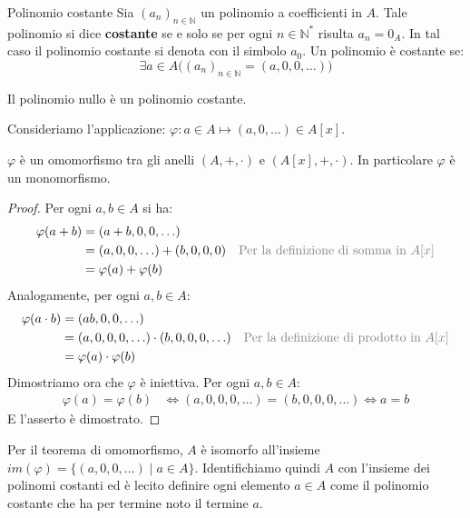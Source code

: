 \begin{defbox}{Polinomio costante}
	Sia $(a_{n})_{n \in \mathbb{N}}$ un polinomio a coefficienti in $A$. Tale polinomio si dice \textbf{costante} se e solo se per ogni $n \in \mathbb{N}^{*}$ risulta $a_{n}=0_{A}$. In tal caso il polinomio costante si denota con il simbolo $a_{0}$. Un polinomio è costante se:
	\begin{displaymath}
		\exists a \in A \bigl( (a_{n})_{n \in \mathbb{N}} = (a,0,0,\ldots) \bigr)
	\end{displaymath}
\end{defbox}

\begin{osservation}
	Il polinomio nullo è un polinomio costante.
\end{osservation}

Consideriamo l'applicazione: $ \varphi: a \in A \mapsto (a,0,\ldots) \in A[x]$.
\begin{propbox}
	$\varphi$ è un omomorfismo tra gli anelli $(A,+,\cdot)$ e $(A[x],+,\cdot)$. In particolare $\varphi$ è un monomorfismo.
\end{propbox}

\begin{proof}
	Per ogni $a,b \in A$ si ha:
	\begin{align*}
		\varphi(a+b) &= (a+b,0,0,\ldots) \\
		&= (a,0,0,\ldots)+(b,0,0,0) & \text{\textcolor{gray}{Per la definizione di somma in $A[x]$}}\\
		&= \varphi(a) + \varphi(b)
	\end{align*}
	Analogamente, per ogni $a,b \in A$:
	\begin{align*}
		\varphi(a \cdot b) &= (ab,0,0,\ldots) \\
		&= (a,0,0,0,\ldots) \cdot (b,0,0,0,\ldots) & \text{\textcolor{gray}{Per la definizione di prodotto in $A[x]$}}\\
		&= \varphi(a) \cdot \varphi(b)
	\end{align*}
	Dimostriamo ora che $\varphi$ è iniettiva. Per ogni $a,b \in A$:
	\begin{align*}
		\varphi(a)= \varphi(b) &\iff (a,0,0,0,\ldots) = (b,0,0,0,\ldots) \iff a=b
	\end{align*}
	E l'asserto è dimostrato.
\end{proof}

Per il teorema di omomorfismo, $A$ è isomorfo all'insieme $im(\varphi)=\{(a,0,0,\ldots) \; | \; a \in A \} $. Identifichiamo quindi $A$ con l'insieme dei polinomi costanti ed è lecito definire ogni elemento $a \in A$ come il polinomio costante che ha per termine noto il termine $a$.

